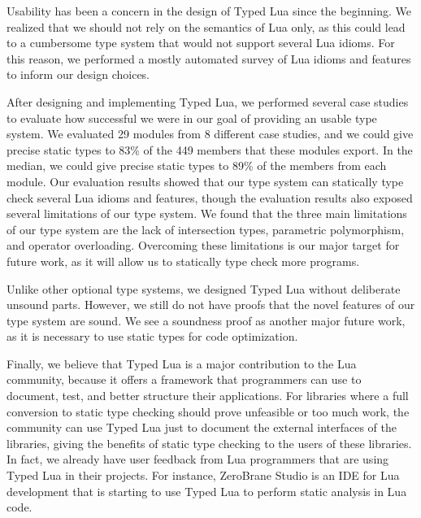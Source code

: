 Usability has been a concern in the design of Typed Lua since the beginning.
We realized that we should not rely on the semantics of Lua only,
as this could lead to a cumbersome type system that would not support
several Lua idioms.
For this reason, we performed a mostly automated survey of Lua idioms
and features to inform our design choices.

After designing and implementing Typed Lua, we performed several
case studies to evaluate how successful we were in our goal of
providing an usable type system.
We evaluated 29 modules from 8 different case studies,
and we could give precise static types to 83\% of the 449
members that these modules export.
In the median, we could give precise static types to 89\%
of the members from each module.
Our evaluation results showed that our type system can statically
type check several Lua idioms and features, though the evaluation
results also exposed several limitations of our type system.
We found that the three main limitations of our type system are
the lack of intersection types, parametric polymorphism, and operator overloading.
Overcoming these limitations is our major target for future work,
as it will allow us to statically type check more programs.

Unlike other optional type systems, we designed Typed Lua without
deliberate unsound parts.
However, we still do not have proofs that the novel features of
our type system are sound.
We see a soundness proof as another major future work, as it is
necessary to use static types for code optimization.

Finally, we believe that Typed Lua is a major contribution to the Lua community,
because it offers a framework that programmers can use to document,
test, and better structure their applications.
For libraries where a full conversion to static type checking should
prove unfeasible or too much work, the community can use Typed Lua
just to document the external interfaces of the libraries,
giving the benefits of static type checking to the users of these
libraries.
In fact, we already have user feedback from Lua programmers that are
using Typed Lua in their projects.
For instance, ZeroBrane Studio is an IDE for Lua development that is
starting to use Typed Lua to perform static analysis in Lua code.

